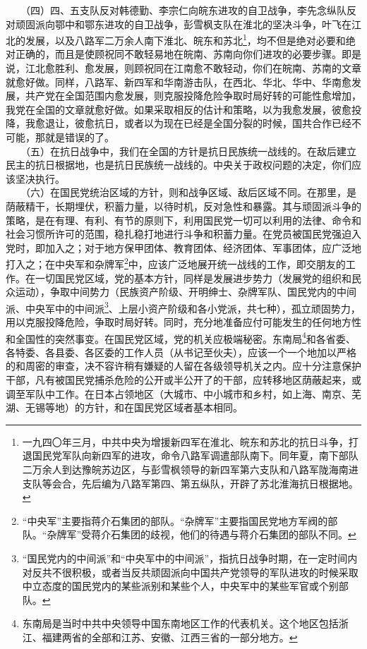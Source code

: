 \documentclass[cn,11pt,chinese]{elegantbook}
\begin{document}
　　（四）四、五支队反对韩德勤、李宗仁向皖东进攻的自卫战争，李先念纵队反对顽固派向鄂中和鄂东进攻的自卫战争，彭雪枫支队在淮北的坚决斗争，叶飞在江北的发展，以及八路军二万余人南下淮北、皖东和苏北\footnote[8]{ 一九四〇年三月，中共中央为增援新四军在淮北、皖东和苏北的抗日斗争，打退国民党军队向新四军的进攻，命令八路军调遣部队南下。同年夏，南下部队二万余人到达豫皖苏边区，与彭雪枫领导的新四军第六支队和八路军陇海南进支队等会合，先后编为八路军第四、第五纵队，开辟了苏北淮海抗日根据地。}，均不但是绝对必要和绝对正确的，而且是使顾祝同不敢轻易地在皖南、苏南向你们进攻的必要步骤。即是说，江北愈胜利、愈发展，则顾祝同在江南愈不敢轻动，你们在皖南、苏南的文章就愈好做。同样，八路军、新四军和华南游击队，在西北、华北、华中、华南愈发展，共产党在全国范围内愈发展，则克服投降危险争取时局好转的可能性愈增加，我党在全国的文章就愈好做。如果采取相反的估计和策略，以为我愈发展，彼愈投降，我愈退让，彼愈抗日，或者以为现在已经是全国分裂的时候，国共合作已经不可能，那就是错误的了。\\
　　（五）在抗日战争中，我们在全国的方针是抗日民族统一战线的。在敌后建立民主的抗日根据地，也是抗日民族统一战线的。中央关于政权问题的决定，你们应该坚决执行。\\
　　（六）在国民党统治区域的方针，则和战争区域、敌后区域不同。在那里，是荫蔽精干，长期埋伏，积蓄力量，以待时机，反对急性和暴露。其与顽固派斗争的策略，是在有理、有利、有节的原则下，利用国民党一切可以利用的法律、命令和社会习惯所许可的范围，稳扎稳打地进行斗争和积蓄力量。在党员被国民党强迫入党时，即加入之；对于地方保甲团体、教育团体、经济团体、军事团体，应广泛地打入之；在中央军和杂牌军\footnote[9]{ “中央军”主要指蒋介石集团的部队。“杂牌军”主要指国民党地方军阀的部队。“杂牌军”受蒋介石集团的歧视，他们的待遇与蒋介石集团的部队不同。}中，应该广泛地展开统一战线的工作，即交朋友的工作。在一切国民党区域，党的基本方针，同样是发展进步势力（发展党的组织和民众运动），争取中间势力（民族资产阶级、开明绅士、杂牌军队、国民党内的中间派、中央军中的中间派\footnote[10]{ “国民党内的中间派”和“中央军中的中间派”，指抗日战争时期，在一定时间内对反共不很积极，或者当反共顽固派向中国共产党领导的军队进攻的时候采取中立态度的国民党内的某些派别和某些个人，中央军中的某些军官或个别部队。}、上层小资产阶级和各小党派，共七种），孤立顽固势力，用以克服投降危险，争取时局好转。同时，充分地准备应付可能发生的任何地方性和全国性的突然事变。在国民党区域，党的机关应极端秘密。东南局\footnote[11]{ 东南局是当时中共中央领导中国东南地区工作的代表机关。这个地区包括浙江、福建两省的全部和江苏、安徽、江西三省的一部分地方。}和各省委、各特委、各县委、各区委的工作人员（从书记至伙夫），应该一个一个地加以严格的和周密的审查，决不容许稍有嫌疑的人留在各级领导机关之内。应十分注意保护干部，凡有被国民党捕杀危险的公开或半公开了的干部，应转移地区荫蔽起来，或调至军队中工作。在日本占领地区（大城市、中小城市和乡村，如上海、南京、芜湖、无锡等地）的方针，和在国民党区域者基本相同。\\
\end{document}

